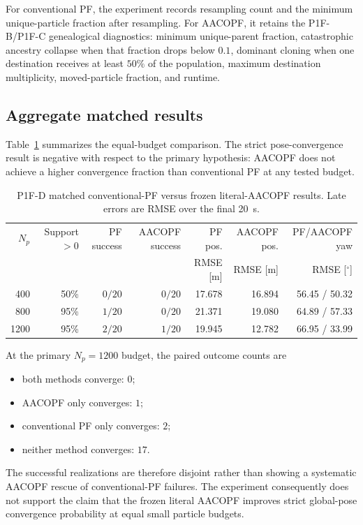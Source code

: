 For conventional PF, the experiment records resampling count and the minimum unique-particle fraction after resampling. For AACOPF, it retains the P1F-B/P1F-C genealogical diagnostics: minimum unique-parent fraction, catastrophic ancestry collapse when that fraction drops below $0.1$, dominant cloning when one destination receives at least $50\%$ of the population, maximum destination multiplicity, moved-particle fraction, and runtime.

\subsection{Aggregate matched results}
Table~\ref{tab:p1fd_main} summarizes the equal-budget comparison. The strict pose-convergence result is negative with respect to the primary hypothesis: AACOPF does not achieve a higher convergence fraction than conventional PF at any tested budget.

\begin{table}[htbp]
    \centering
    \caption{P1F-D matched conventional-PF versus frozen literal-AACOPF results. Late errors are RMSE over the final \SI{20}{s}.}
    \label{tab:p1fd_main}
    \begin{tabular}{rrrrrrr}
        \toprule
        $N_p$ & Support $>0$ & PF success & AACOPF success & PF pos. & AACOPF pos. & PF/AACOPF yaw\\
        & & & & RMSE [m] & RMSE [m] & RMSE [$^\circ$]\\
        \midrule
        400  & 50\% & $0/20$ & $0/20$ & 17.678 & 16.894 & 56.45 / 50.32\\
        800  & 95\% & $1/20$ & $0/20$ & 21.371 & 19.080 & 64.89 / 57.33\\
        1200 & 95\% & $2/20$ & $1/20$ & 19.945 & 12.782 & 66.95 / 33.99\\
        \bottomrule
    \end{tabular}
\end{table}

At the primary $N_p=1200$ budget, the paired outcome counts are
\begin{itemize}
    \item both methods converge: $0$;
    \item AACOPF only converges: $1$;
    \item conventional PF only converges: $2$;
    \item neither method converges: $17$.
\end{itemize}
The successful realizations are therefore disjoint rather than showing a systematic AACOPF rescue of conventional-PF failures. The experiment consequently does not support the claim that the frozen literal AACOPF improves strict global-pose convergence probability at equal small particle budgets.

